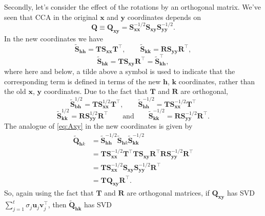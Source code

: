 \documentclass[]{book}
\theoremstyle{definition}
\theoremstyle{definition}
\theoremstyle{definition}
\theoremstyle{remark}
\begin{document}
Secondly, let's consider the effect of the rotations by an orthogonal matrix. We've seen that CCA in the original \(\mathbf x\) and \(\mathbf y\) coordinates depends on
\begin{equation}
\mathbf Q\equiv \mathbf Q_{\mathbf x\mathbf y}=\mathbf S_{\mathbf x\mathbf x}^{-1/2}\mathbf S_{\mathbf x\mathbf y}\mathbf S_{\mathbf y\mathbf y}^{-1/2}.
\label{eq:Axy}
\end{equation}
In the new coordinates we have
\[
\tilde{\mathbf S}_{\mathbf h\mathbf h}={\mathbf T} \mathbf S_{\mathbf x\mathbf x}{\mathbf T}^\top, \qquad \tilde{\mathbf S}_{\mathbf k\mathbf k}={\mathbf R}\mathbf S_{\mathbf y\mathbf y}{\mathbf R}^\top,
\]
\[
\tilde{\mathbf S}_{\mathbf h\mathbf k}={\mathbf T}\mathbf S_{\mathbf x\mathbf y}{\mathbf R}^\top =
\tilde{\mathbf S}_{\mathbf k\mathbf h}^\top,
\]
where here and below, a tilde above a symbol is used to indicate that the corresponding term is defined in terms of the new \(\mathbf h\), \(\mathbf k\) coordinates, rather
than the old \(\mathbf x\), \(\mathbf y\) coordinates.
Due to the fact that \(\mathbf T\) and \(\mathbf R\) are orthogonal,
\[
\tilde{\mathbf S}_{\mathbf b\mathbf h}^{ 1/2}={\mathbf T}\mathbf S_{\mathbf x\mathbf x}^{ 1/2}{\mathbf T}^\top, \qquad
\tilde{\mathbf S}_{\mathbf h\mathbf h}^{ -1/2}={\mathbf T}\mathbf S_{\mathbf x\mathbf x}^{ -1/2}{\mathbf T}^\top
\]
\[
\tilde{\mathbf S}_{\mathbf k\mathbf k}^{ 1/2}={\mathbf R}\mathbf S_{\mathbf y\mathbf y}^{ 1/2}{\mathbf R}^\top \qquad \text{and} \qquad
\tilde{\mathbf S}_{\mathbf k\mathbf k}^{ -1/2}={\mathbf R}\mathbf S_{\mathbf y\mathbf y}^{- 1/2}{\mathbf R}^\top.
\]
The analogue of \eqref{eq:Axy} in the new coordinates is given by
\begin{align*}
\tilde{\mathbf Q}_{\mathbf h k}&=\tilde{\mathbf S}_{\mathbf h\mathbf h}^{-1/2}\tilde{\mathbf S}_{\mathbf h k}\tilde{\mathbf S}_{\mathbf k\mathbf k}^{-1/2}\\
&={\mathbf T} \mathbf S_{\mathbf x\mathbf x}^{-1/2}{\mathbf T}^\top {\mathbf T}\mathbf S_{\mathbf x\mathbf y}{\mathbf R}^\top {\mathbf R}\mathbf S_{\mathbf y\mathbf y}^{-1/2}{\mathbf R}^\top\\
&={\mathbf T}\mathbf S_{\mathbf x\mathbf x}^{-1/2}\mathbf S_{\mathbf x\mathbf y}\mathbf S_{\mathbf y\mathbf y}^{-1/2}{\mathbf R}^\top\\
&={\mathbf T} \mathbf Q_{\mathbf x\mathbf y}{\mathbf R}^\top.
\end{align*}
So, again using the fact that \(\mathbf T\) and \(\mathbf R\) are orthogonal matrices, if \(\mathbf Q_{\mathbf x\mathbf y}\) has SVD \(\sum_{j=1}^t \sigma_j {\mathbf u}_j {\mathbf v}_j^\top\), then \(\tilde{\mathbf Q}_{\mathbf h\mathbf k}\) has SVD
\end{document}
